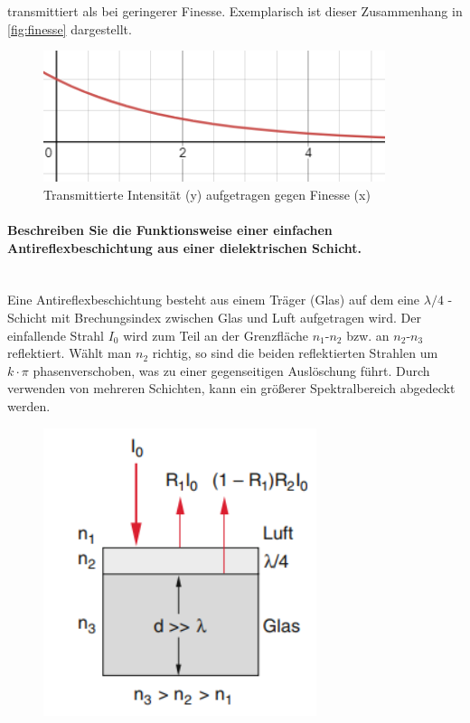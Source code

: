 \documentclass[a4paper, 11pt, ngerman, parskip=half-]{scrartcl}
\newcommand{\myparagraph}[1]{\paragraph{#1}\mbox{}\\}
\begin{document}
transmittiert als bei geringerer Finesse. Exemplarisch ist dieser Zusammenhang in \autoref{fig:finesse} dargestellt.
\begin{figure}[H]
    \centering
    \includegraphics[width=10cm]{image/18_Interferenz/Finesse_gegen_Transmission.png}
    \caption{Transmittierte Intensität (y) aufgetragen gegen Finesse (x)}
    \label{fig:finesse}
\end{figure}

\myparagraph{Beschreiben Sie die Funktionsweise einer einfachen Antireflexbeschichtung aus einer
    dielektrischen Schicht.}
Eine Antireflexbeschichtung besteht aus einem Träger (Glas) auf dem eine $\lambda/4$ - Schicht mit Brechungsindex zwischen Glas und Luft aufgetragen wird. Der einfallende Strahl
$I_0$ wird zum Teil an der Grenzfläche $n_1$-$n_2$ bzw. an $n_2$-$n_3$ reflektiert. Wählt man $n_2$ richtig, so sind die beiden reflektierten Strahlen um $k \cdot \pi$ phasenverschoben,
was zu einer gegenseitigen Auslöschung führt. Durch verwenden von mehreren Schichten, kann ein größerer Spektralbereich abgedeckt werden.
\begin{figure}[H]
    \centering
    \includegraphics[width=8cm]{image/18_Interferenz/Antireflexionsbeschichtung.png}
\end{figure}

\newpage
\end{document}

